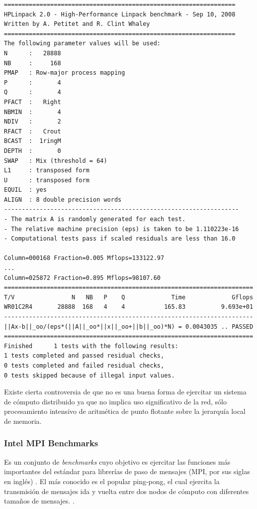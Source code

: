 \documentclass[a4paper]{report}
\begin{document}
{\small
\begin{verbatim}
=================================================================
HPLinpack 2.0 - High-Performance Linpack benchmark - Sep 10, 2008
Written by A. Petitet and R. Clint Whaley
=================================================================
The following parameter values will be used:
N      :   28888
NB     :     168
PMAP   : Row-major process mapping
P      :       4
Q      :       4
PFACT  :   Right
NBMIN  :       4
NDIV   :       2
RFACT  :   Crout
BCAST  :  1ringM
DEPTH  :       0
SWAP   : Mix (threshold = 64)
L1     : transposed form
U      : transposed form
EQUIL  : yes
ALIGN  : 8 double precision words
------------------------------------------------------------------
- The matrix A is randomly generated for each test.
- The relative machine precision (eps) is taken to be 1.110223e-16
- Computational tests pass if scaled residuals are less than 16.0

Column=000168 Fraction=0.005 Mflops=133122.97
...
Column=025872 Fraction=0.895 Mflops=98107.60
======================================================================
T/V                N   NB   P    Q             Time             Gflops
WR01C2R4       28888  168   4    4           165.83          9.693e+01
----------------------------------------------------------------------
||Ax-b||_oo/(eps*(||A||_oo*||x||_oo+||b||_oo)*N) = 0.0043035 .. PASSED
======================================================================
Finished      1 tests with the following results:
1 tests completed and passed residual checks,
0 tests completed and failed residual checks,
0 tests skipped because of illegal input values.
\end{verbatim}
}

\bigskip

Existe cierta controversia de que no es una buena forma de ejercitar un
sistema de cómputo distribuido ya que no implica uso significativo de la
red, sólo procesamiento intensivo de aritmética de punto flotante
sobre la jerarquía local de memoria.

\subsubsection{Intel MPI Benchmarks}

Es un conjunto de {\it benchmarks} cuyo objetivo es ejercitar las funciones
más importantes del estándar para librerías de paso de mensajes (MPI, por sus siglas en inglés) \cite{mpi-standard}.
El más conocido es el popular ping-pong, el cual ejercita la transmisión de mensajes ida y vuelta entre dos nodos de
cómputo con diferentes tamaños de mensajes. \cite{latency}.
\end{document}
